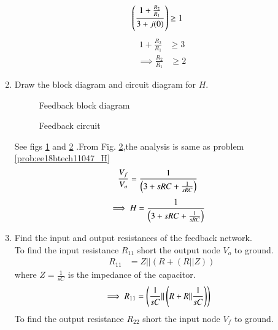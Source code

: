 \begin{enumerate}[label=\thesection.\arabic*.,ref=\thesection.\theenumi]
\begin{align}
\left(\frac{1+\frac{R_{2}}{R_{1}}}{3+j(0)}\right) &\geq 1
\end{align}
\begin{align}
1+\frac{R_{2}}{R_{1}} &\geq 3
\end{align}
\begin{align}
\implies \frac{R_{2}}{R_{1}} &\geq 2
\end{align}
\item Draw the block diagram and circuit diagram for $H$.\\
\renewcommand{\thefigure}{\theenumi.\arabic{figure}}
\begin{figure}[!ht]
	\begin{center}
		\resizebox{\columnwidth}{!}{}
	\end{center}
\caption{Feedback block diagram}
\label{fig:ee18btech11047_fig4}
\end{figure}
\begin{figure}[!ht]
	\begin{center}
		\resizebox{\columnwidth}{!}{}
	\end{center}
\caption{Feedback circuit}
\label{fig:ee18btech11047_fig5}
\end{figure}
\renewcommand{\thefigure}{\theenumi}
\solution See figs \ref{fig:ee18btech11047_fig4} and \ref{fig:ee18btech11047_fig5} .From Fig. \ref{fig:ee18btech11047_fig5},the analysis is same as problem \ref{prob:ee18btech11047_H}
\begin{align}
\frac{V_{f}}{V_{o}} &= \frac{1}{\left(3+sRC +\frac{1}{sRC}\right)}
\end{align}
\begin{align}
\implies H &= \frac{1}{\left(3+sRC +\frac{1}{sRC}\right)}
\end{align}
%
\item Find the input and output resistances of the feedback network.\\
\solution To find the input resistance $R_{11}$ short the output node $V_{o}$ to ground.
\begin{align}
R_{11} &= Z ||(R+ (R||Z)) 
\end{align}
where $Z=\frac{1}{sC}$ is the impedance of the capacitor.
\begin{align}
\label{eq:ee18btech11047_6}
\implies R_{11} &= \brak{\frac{1}{sC}||\brak{R+R ||\frac{1}{sC}}}
\end{align}
To find the output resistance $R_{22}$ short the input node $V_{f}$ to ground.

\end{enumerate}
